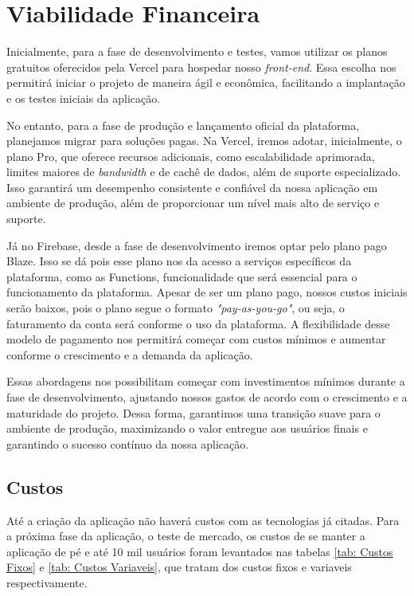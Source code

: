 \section{Viabilidade Financeira}

Inicialmente, para a fase de desenvolvimento e testes, vamos utilizar os planos gratuitos oferecidos pela Vercel para hospedar nosso \textit{front-end}. Essa escolha nos permitirá iniciar o projeto de maneira ágil e econômica, facilitando a implantação e os testes iniciais da aplicação.

No entanto, para a fase de produção e lançamento oficial da plataforma, planejamos migrar para soluções pagas. Na Vercel, iremos adotar, inicialmente, o plano Pro, que oferece recursos adicionais, como escalabilidade aprimorada, limites maiores de \textit{bandwidth} e de cachê de dados, além de suporte especializado. Isso garantirá um desempenho consistente e confiável da nossa aplicação em ambiente de produção, além de proporcionar um nível mais alto de serviço e suporte.

Já no Firebase, desde a fase de desenvolvimento iremos optar pelo plano pago Blaze. Isso se dá pois esse plano nos da acesso a serviços específicos da plataforma, como as Functions, funcionalidade que será essencial para o funcionamento da plataforma. Apesar de ser um plano pago, nossos custos iniciais serão baixos, pois o plano segue o formato \textit{"pay-as-you-go"}, ou seja, o faturamento da conta será conforme o uso da plataforma. A flexibilidade desse modelo de pagamento nos permitirá começar com custos mínimos e aumentar conforme o crescimento e a demanda da aplicação.


Essas abordagens nos possibilitam começar com investimentos mínimos durante a fase de desenvolvimento, ajustando nossos gastos de acordo com o crescimento e a maturidade do projeto. Dessa forma, garantimos uma transição suave para o ambiente de produção, maximizando o valor entregue aos usuários finais e garantindo o sucesso contínuo da nossa aplicação.

\subsection{Custos}

Até a criação da aplicação não haverá custos com as tecnologias já citadas. Para a próxima fase da aplicação, o teste de mercado, os custos de se manter a aplicação de pé e até 10 mil usuários foram levantados nas tabelas \ref{tab: Custos Fixos} e \ref{tab: Custos Variaveis}, que tratam dos custos fixos e variaveis respectivamente.

